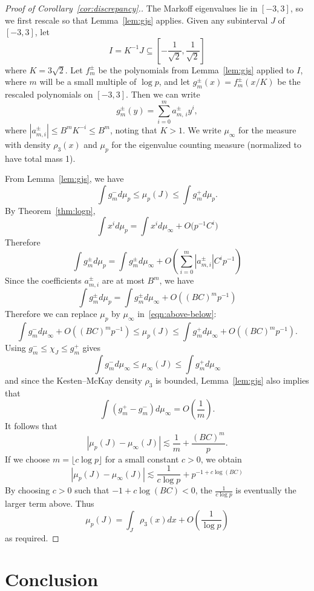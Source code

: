 \documentclass[10pt]{amsart}
\theoremstyle{definition}\newtheorem{defi}[theo]{Definition}\newtheorem{rema}[theo]{Remark}\newtheorem{exam}[theo]{Example}\newtheorem{exem}[theo]{Example}\newtheorem{nota}[theo]{Notation}
\begin{document}
\begin{proof}[{Proof of Corollary~\ref{cor:discrepancy}.}]
The Markoff eigenvalues lie in $[-3,3]$, so we first rescale so that Lemma~\ref{lem:gjs} applies. Given any subinterval $J$ of $[-3,3]$, let
\[
I = K^{-1} J \subseteq \left[-\frac{1}{\sqrt{2}}, \frac{1}{\sqrt{2}} \right]
\]
where $K = 3\sqrt{2}$. Let $f_m^{\pm}$ be the polynomials from Lemma~\ref{lem:gjs} applied to $I$, where $m$ will be a small multiple of $\log{p}$, and let $g_m^\pm(x) = f_m^{\pm}(x/K)$ be the rescaled polynomials on $[-3,3]$. Then we can write
\[
g_m^{\pm}(y) = \sum_{i=0}^m a_{m,\,i}^{\pm} y^i,
\]
where $|a_{m,i}^{\pm}| \leq B^m K^{-i} \leq B^m$, noting that $K > 1$. We write $\mu_{\infty}$ for the measure with density $\rho_3(x)$ and $\mu_p$ for the eigenvalue counting measure (normalized to have total mass 1).

From Lemma~\ref{lem:gjs}, we have
\begin{equation}\label{eqn:above-below}
\int g_m^- d\mu_p \leq \mu_p(J) \leq \int g_m^+ d\mu_p.
\end{equation}
By Theorem~\ref{thm:logp},
\[
\int x^i d\mu_p = \int x^i d\mu_{\infty} + O\big(p^{-1} C^i \big)
\]
Therefore
\[
\int g_m^{\pm} d\mu_p = \int g_m^{\pm} d\mu_{\infty} + O\left(\sum_{i=0}^m \left|a_{m,i}^{\pm}\right| C^i p^{-1} \right)
\]
Since the coefficients $a_{m,i}^{\pm}$ are at most $B^m$, we have
\[
\int g_m^{\pm} d\mu_p = \int g_m^{\pm} d\mu_{\infty} + O\left((BC)^m p^{-1} \right)
\]
Therefore we can replace $\mu_p$ by $\mu_{\infty}$ in~\eqref{eqn:above-below}:
\[
\int g_m^- d\mu_{\infty} + O\left((BC)^m p^{-1} \right) \leq \mu_p(J) \leq \int g_m^+ d\mu_{\infty} + O\left((BC)^m p^{-1} \right).
\]
Using $g_m^- \leq \chi_J \leq g_m^+$ gives
\[
\int g_m^- d\mu_{\infty} \leq \mu_{\infty}(J) \leq \int g_m^+ d\mu_{\infty}
\]
and since the Kesten--McKay density $\rho_3$ is bounded, Lemma~\ref{lem:gjs} also implies that
\[
\int (g_m^+ - g_m^-) d\mu_{\infty} = O\left(\frac{1}{m} \right).
\]
It follows that
\[
|\mu_p(J) - \mu_{\infty}(J) | \lesssim \frac{1}{m} + \frac{(BC)^m}{p}.
\]
If we choose $m = \lfloor c \log{p} \rfloor$ for a small constant $c > 0$, we obtain
\[
|\mu_p(J) - \mu_{\infty}(J) | \lesssim \frac{1}{c \log{p}} + p^{-1+c\log(B C)}
\]
By choosing $c>0$ such that $-1 + c\log(B C)<0$, the $ \frac{1}{c \log{p}}$ is eventually the larger term above. Thus
\[
\mu_{p}(J) =\int_{J} \rho_{3}(x) dx+O\left(\frac{1}{\log p} \right)
\]
as required.
\end{proof}

\section{Conclusion} \label{sec:conc}
\end{document}
